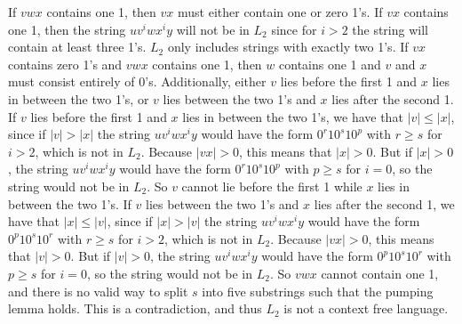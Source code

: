 \documentclass[12pt]{article}
\begin{document}
If \(vwx\) contains one 1, then \(vx\) must either contain one or zero 1's. If \(vx\) contains one 1, then the string \(uv^iwx^iy\)
will not be in \(L_2\) since for \(i>2\) the string will contain at least three 1's. \(L_2\) only includes strings with exactly two 1's.
If \(vx\) contains zero 1's and \(vwx\) contains one 1, then \(w\) contains one 1 and \(v\) and \(x\) must consist entirely of 0's. Additionally,
either \(v\) lies before the first 1 and \(x\) lies in between the two 1's, or \(v\) lies between the two 1's and \(x\) lies after the second 1.
If \(v\) lies before the first 1 and \(x\) lies in between the two 1's, we have that \(|v|\leq |x|\), since if \(|v|>|x|\) the string \(uv^iwx^iy\)
would have the form \(0^r10^s10^p\) with \(r\geq s\) for \(i>2\), which is not in \(L_2\). Because \(|vx|>0\), this means that \(|x|>0\). But if \(|x|>0\),
the string \(uv^iwx^iy\) would have the form \(0^r10^s10^p\) with \(p\geq s\) for \(i=0\), so the string would not be in \(L_2\).
So \(v\) cannot lie before the first 1 while \(x\) lies in between the two 1's. If \(v\) lies between the two 1's and \(x\) lies after the second 1,
we have that \(|x|\leq |v|\), since if \(|x|>|v|\) the string \(uv^iwx^iy\) would have the form \(0^p10^s10^r\) with \(r\geq s\) for \(i>2\), which is not in \(L_2\).
Because \(|vx|>0\), this means that \(|v|>0\). But if \(|v|>0\), the string \(uv^iwx^iy\) would have the form \(0^p10^s10^r\)
with \(p\geq s\) for \(i=0\), so the string would not be in \(L_2\). So \(vwx\) cannot contain one 1, and there is no valid way to
split \(s\) into five substrings such that the pumping lemma holds. This is a contradiction, and thus \(L_2\) is not a context free language.
\end{document}
